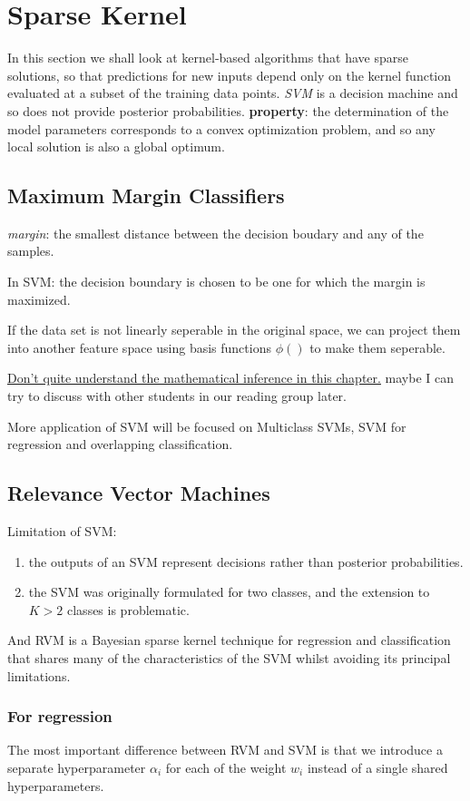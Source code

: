 \documentclass[a4paper]{book}
\begin{document}
\section{Sparse Kernel}
In this section we shall look at kernel-based algorithms that have sparse solutions, so that predictions for new inputs depend only on the kernel function evaluated at a subset of the training data points.\newline
\emph{SVM} is a decision machine and so does not provide posterior probabilities.
\textbf{property}: the  determination of the model parameters corresponds to a convex optimization problem, and so any local solution is also a global optimum.
\subsection{Maximum Margin Classifiers}
\emph{margin}: the smallest distance between the decision boudary and any of the samples.

In SVM: the decision boundary is chosen to be one for which the margin is maximized.

If the data set is not linearly seperable in the original space, we can project them into another feature space using basis functions $\phi()$  to make them seperable.

\uline{Don't quite understand the mathematical inference in this chapter.}  maybe I can try to discuss with other students in our reading group later.

More application of SVM will be focused on Multiclass SVMs, SVM for regression and overlapping classification.
\subsection{Relevance Vector Machines}
Limitation of SVM:
\begin{enumerate}
  \item the outputs of an SVM represent decisions rather than posterior probabilities.
  \item  the SVM was originally formulated for two classes, and the extension to $K > 2$ classes is problematic.
\end{enumerate}

And RVM is a Bayesian sparse kernel technique for regression and classification that shares many of the characteristics of the SVM whilst avoiding its principal limitations.

\subsubsection{For regression}
The most important difference between RVM and SVM is that we introduce a separate hyperparameter $\alpha_i$ for each of the weight $w_i$ instead of a single shared hyperparameters.
\end{document}
